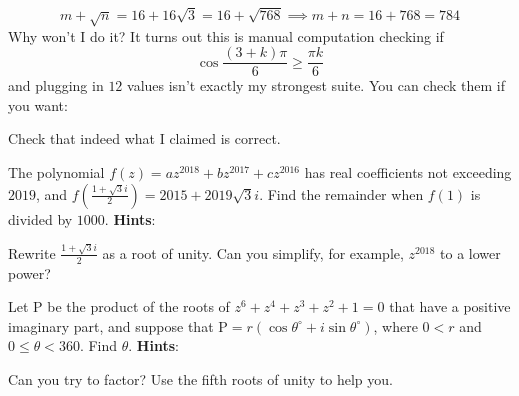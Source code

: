 \documentclass[11pt,titlepage]{scrartcl}
\newenvironment{hint}{\footnotesize \normalfont \textbf{Hints}:}{\hspace{-0.5ex}}
\begin{document}
\[m+\sqrt{n}=16+16\sqrt 3=16+\sqrt{768}\implies m+n=16+768=\boxed{784}\]
Why won't I do it? It turns out this is manual computation checking if
\[\cos\dfrac{(3+k)\pi}{6}\geq\dfrac{\pi k}{6}\]
and plugging in $12$ values isn't exactly my strongest suite. You can check them if you want:
\begin{exercisebox}
\begin{exercise}
Check that indeed what I claimed is correct.
\end{exercise}
\begin{exercise}
The polynomial $f(z)=az^{2018}+bz^{2017}+cz^{2016}$ has real coefficients not exceeding $2019$, and $f\left(\tfrac{1+\sqrt{3}i}{2}\right)=2015+2019\sqrt{3}i$. Find the remainder when $f(1)$ is divided by $1000$.
\begin{hint}
\begin{addhint}{
Rewrite $\tfrac{1+\sqrt 3i}{2}$ as a root of unity. Can you simplify, for example, $z^{2018}$ to a lower power?
}\end{addhint}
\end{hint}
\end{exercise}
\begin{exercise}
Let $\mathrm {P}$ be the product of the roots of $z^6+z^4+z^3+z^2+1=0$ that have a positive imaginary part, and suppose that $\mathrm {P}=r(\cos{\theta^{\circ}}+i\sin{\theta^{\circ}})$, where $0<r$ and $0\leq \theta <360$. Find $\theta$.
\begin{hint}
\begin{addhint}{
Can you try to factor? Use the fifth roots of unity to help you.
}\end{addhint}
\end{hint}
\end{exercise}
\end{exercisebox}
\end{document}
